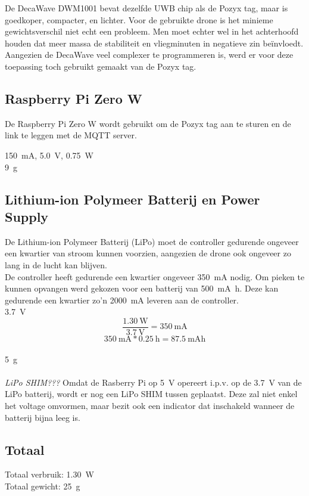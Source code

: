 De DecaWave DWM1001 bevat dezelfde UWB chip als de Pozyx tag, maar is goedkoper, compacter, en lichter. Voor de gebruikte drone is het minieme gewichtsverschil niet echt een probleem. Men moet echter wel in het achterhoofd houden dat meer massa de stabiliteit en vliegminuten in negatieve zin be\"invloedt.\\
Aangezien de DecaWave veel complexer te programmeren is, werd er voor deze toepassing toch gebruikt gemaakt van de Pozyx tag.

\subsection{Raspberry Pi Zero W} \label{sec:raspberry_pi}
De Raspberry Pi Zero W wordt gebruikt om de Pozyx tag aan te sturen en de link te leggen met de MQTT server.

\SI{150}{\mA}, \SI{5.0}{\V}, \SI{0.75}{\W}\\
\SI{9}{\g}

\subsection{Lithium-ion Polymeer Batterij en Power Supply} \label{sec:lipo}
De Lithium-ion Polymeer Batterij (LiPo) moet de controller gedurende ongeveer een kwartier van stroom kunnen voorzien, aangezien de drone ook ongeveer zo lang in de lucht kan blijven.\\
De controller heeft gedurende een kwartier ongeveer \SI{350}{\mA} nodig. Om pieken te kunnen opvangen werd gekozen voor een batterij van \SI{500}{\mA\hour}. Deze kan gedurende een kwartier zo'n \SI{2000}{\mA} leveren aan de controller.\\

\SI{3.7}{\V}
\[\frac{\SI{1.30}{\W}}{\SI{3.7}{\V}}=\SI{350}{\mA}\]
\[\SI{350}{\mA}*\SI{0.25}{\hour}=\SI{87.5}{\mA\hour}\]\\
\SI{5}{\g}\\
\\
\textit{LiPo SHIM???}
Omdat de Rasberry Pi op \SI{5}{\V} opereert i.p.v. op de \SI{3.7}{\V} van de LiPo batterij, wordt er nog een LiPo SHIM tussen geplaatst. Deze zal niet enkel het voltage omvormen, maar bezit ook een indicator dat inschakeld wanneer de batterij bijna leeg is.

\subsection{Totaal} \label{sec:totaal}
Totaal verbruik: \SI{1.30}{\W}\\
Totaal gewicht: \SI{25}{\g}

